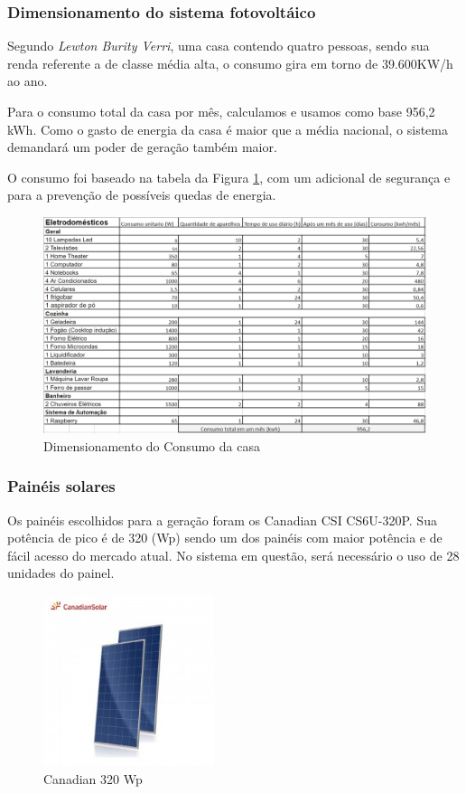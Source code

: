 \subsubsection{Dimensionamento do sistema fotovoltáico}
\par Segundo \textit{Lewton Burity Verri}, uma casa contendo quatro pessoas, sendo sua renda referente a de classe média alta, o consumo gira em torno de 39.600KW/h ao ano.
\par Para o consumo total da casa por mês, calculamos e usamos como base 956,2 kWh. Como o gasto de energia da casa é maior que a média nacional, o sistema demandará um poder de geração também maior.
\par O consumo foi baseado na tabela da Figura \ref{fig:dimensionamento}, com um adicional de segurança e para a prevenção de possíveis quedas de energia.

\begin{figure}[!h]
\label{fig:dimensionamento}
\centering
\caption{Dimensionamento do Consumo da casa}
\includegraphics[width=\textwidth]{figuras/dimensionamento_consumo}
\end{figure}

\subsubsection{Painéis solares}
\par Os painéis escolhidos para a geração foram os Canadian CSI CS6U-320P. Sua potência de pico é de 320 (Wp) sendo um dos painéis com maior potência e de fácil acesso do mercado atual. No sistema em questão, será necessário o uso de 28 unidades do painel.

\begin{figure}[!h]
\centering
\caption{Canadian 320 Wp}
\includegraphics[width=5cm]{figuras/paineis_solares}
\end{figure}


